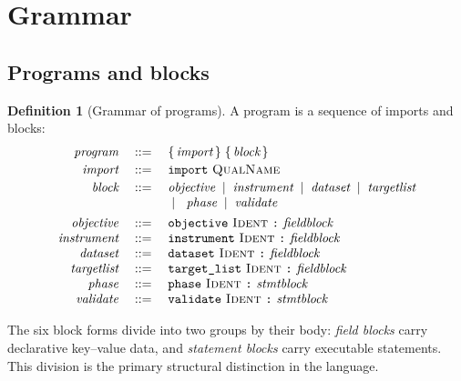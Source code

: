 \documentclass[11pt,twocolumn,a4paper]{article}
\theoremstyle{ssthm}
\theoremstyle{definition}
\newtheorem{definition}[theorem]{Definition}
\theoremstyle{remark}
\newcommand{\bnf}{\;::=\;}
\newcommand{\alt}{\;\mid\;}
\newcommand{\shk}[1]{\texttt{#1}}
\begin{document}
\section{Grammar}
\label{sec:grammar}

\subsection{Programs and blocks}

\begin{definition}[Grammar of programs]
\label{def:grammar}
A program is a sequence of imports and blocks:
\[
\begin{array}{rcl}
\textit{program}    &\bnf& \{\,\textit{import}\,\}\;\{\,\textit{block}\,\}\\[2pt]
\textit{import}     &\bnf& \shk{import}\ \textsc{QualName}\\[2pt]
\textit{block}      &\bnf& \textit{objective} \alt \textit{instrument}
                           \alt \textit{dataset} \alt \textit{targetlist}\\
                    &   & \alt\ \textit{phase} \alt \textit{validate}\\[4pt]
\textit{objective}  &\bnf& \shk{objective}\ \textsc{Ident}\ \shk{:}\ \textit{fieldblock}\\
\textit{instrument} &\bnf& \shk{instrument}\ \textsc{Ident}\ \shk{:}\ \textit{fieldblock}\\
\textit{dataset}    &\bnf& \shk{dataset}\ \textsc{Ident}\ \shk{:}\ \textit{fieldblock}\\
\textit{targetlist} &\bnf& \shk{target\_list}\ \textsc{Ident}\ \shk{:}\ \textit{fieldblock}\\
\textit{phase}      &\bnf& \shk{phase}\ \textsc{Ident}\ \shk{:}\ \textit{stmtblock}\\
\textit{validate}   &\bnf& \shk{validate}\ \textsc{Ident}\ \shk{:}\ \textit{stmtblock}
\end{array}
\]
\end{definition}

The six block forms divide into two groups by their body: \emph{field
blocks} carry declarative key--value data, and \emph{statement blocks}
carry executable statements. This division is the primary structural
distinction in the language.
\end{document}
